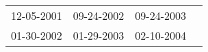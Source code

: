 \begin{supertabular}{llll}
 12-05-2001 &  09-24-2002 &  09-24-2003 \\
 01-30-2002 &  01-29-2003 &  02-10-2004 \\
\end{supertabular}
